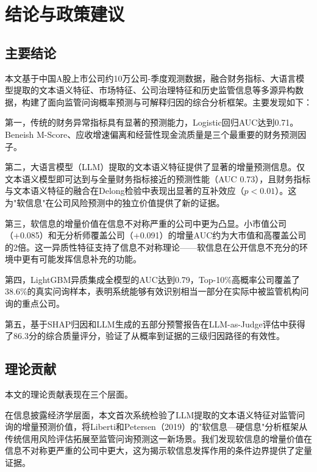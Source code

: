 
\section{结论与政策建议}

\subsection{主要结论}

本文基于中国A股上市公司约10万公司-季度观测数据，融合财务指标、大语言模型提取的文本语义特征、市场特征、公司治理特征和历史监管信息等多源异构数据，构建了面向监管问询概率预测与可解释归因的综合分析框架。主要发现如下：

第一，传统的财务异常指标具有显著的预测能力，Logistic回归AUC达到0.71。Beneish M-Score、应收增速偏离和经营性现金流质量是三个最重要的财务预测因子。

第二，大语言模型（LLM）提取的文本语义特征提供了显著的增量预测信息。仅文本语义模型即可达到与全量财务指标接近的预测性能（AUC 0.73），且财务指标与文本语义特征的融合在Delong检验中表现出显著的互补效应（$p<0.01$）。这为"软信息"在公司风险预测中的独立价值提供了新的证据。

第三，软信息的增量价值在信息不对称严重的公司中更为凸显。小市值公司（+0.085）和无分析师覆盖公司（+0.091）的增量AUC约为大市值和高覆盖公司的2倍。这一异质性特征支持了信息不对称理论——软信息在公开信息不充分的环境中更有可能发挥信息补充的功能。

第四，LightGBM异质集成全模型的AUC达到0.79，Top-10\%高概率公司覆盖了38.6\%的真实问询样本，表明系统能够有效识别相当一部分在实际中被监管机构问询的重点公司。

第五，基于SHAP归因和LLM生成的五部分预警报告在LLM-as-Judge评估中获得了86.3分的综合质量评分，验证了从概率到证据的三级归因路径的有效性。

\subsection{理论贡献}

本文的理论贡献表现在三个层面。

在信息披露经济学层面，本文首次系统检验了LLM提取的文本语义特征对监管问询的增量预测价值，将Liberti和Petersen（2019）的"软信息—硬信息"分析框架从传统信用风险评估拓展至监管问询预测这一新场景。我们发现软信息的增量价值在信息不对称更严重的公司中更大，这为揭示软信息发挥作用的条件边界提供了定量证据。

